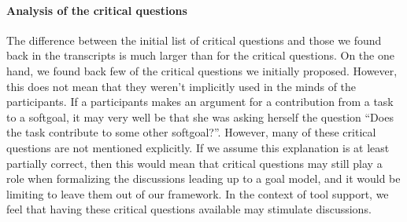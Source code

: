 \documentclass[11.5pt,two column]{llncs}
\begin{document}
\paragraph{Analysis of the critical questions} The difference between the initial list of critical questions and those we found back in the transcripts is much larger than for the critical questions. On the one hand, we found back few of the critical questions we initially proposed. However, this does not mean that they weren't implicitly used in the minds of the participants. If a participants makes an argument for a contribution from a task to a softgoal, it may very well be that she was asking herself the question ``Does the task contribute to some other softgoal?''. However, many of these critical questions are not mentioned explicitly. If we assume this explanation is at least partially correct, then this would mean that critical questions may still play a role when formalizing the discussions leading up to a goal model, and it would be limiting to leave them out of our framework. In the context of tool support, we feel that having these critical questions available may stimulate discussions.
\end{document}
